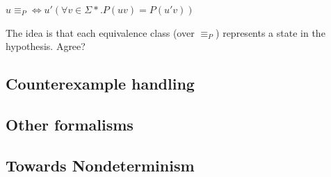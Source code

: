 \begin{center}
	$u \equiv_{P} \Leftrightarrow u'( \forall v \in \Sigma* . P(uv) = P(u'v))$
\end{center}

The idea is that each equivalence class (over $\equiv_{P}$) represents a state in the hypothesis. Agree?

\subsection{Counterexample handling}

\subsection{Other formalisms}

\subsection{Towards Nondeterminism}